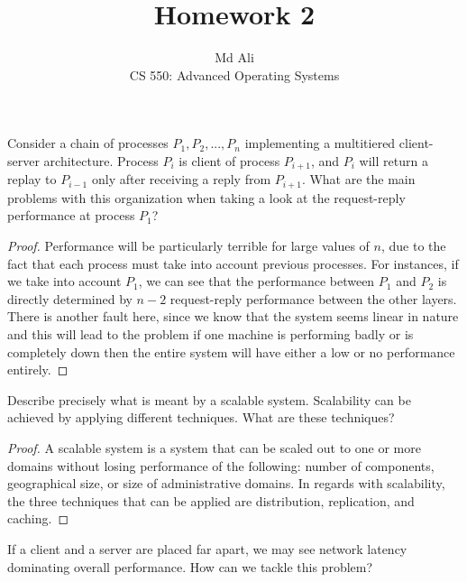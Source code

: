 \documentclass[12pt]{article}
\newenvironment{exercise}[2][Exercise]{\begin{trivlist}
\item[\hskip \labelsep {\bfseries #1}\hskip \labelsep {\bfseries #2.}]}{\end{trivlist}}
\begin{document}
 
\title{Homework 2}
\author{Md Ali\\ 
CS 550: Advanced Operating Systems} 
 
\maketitle
 
\begin{exercise}{1}
Consider a chain of processes $P_1, P_2,..., P_n$ implementing a multitiered client-server architecture. Process $P_i$ is client of process $P_{i+1}$, and $P_i$ will return a replay to $P_{i-1}$ only after receiving a reply from $P_{i+1}$. What are the main problems with this organization when taking a look at the request-reply performance at process $P_1$?
\end{exercise} 

\begin{proof}
Performance will be particularly terrible for large values of $n$, due to the fact that each process must take into account previous processes. For instances, if we take into account $P_1$, we can see that the performance between $P_1$ and $P_2$ is directly determined by $n-2$ request-reply performance between the other layers. There is another fault here, since we know that the system seems linear in nature and this will lead to the problem if one machine is performing badly or is completely down then the entire system will have either a low or no performance entirely. 
\end{proof}
 
\begin{exercise}{2}
Describe precisely what is meant by a scalable system. Scalability can be achieved by applying different techniques. What are these techniques? 
\end{exercise}
 
\begin{proof}
A scalable system is a system that can be scaled out to one or more domains without losing performance of the following: number of components, geographical size, or size of administrative domains. In regards with scalability, the three techniques that can be applied are distribution, replication, and caching. 
\end{proof}

\begin{exercise}{3}
If a client and a server are placed far apart, we may see network latency dominating overall performance. How can we tackle this problem?
\end{exercise}
\end{document}
